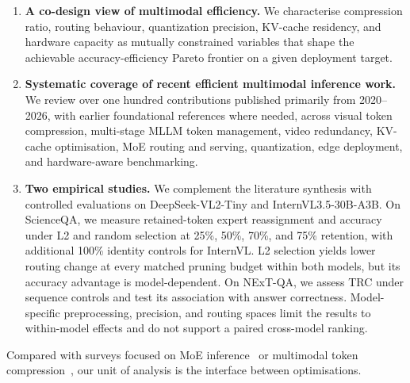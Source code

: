 \documentclass[10pt]{article}
\newenvironment{reviewchange}{\begingroup\color{red}}{\endgroup}
\begin{document}
\begin{reviewchange}
\begin{enumerate}[leftmargin=2em, itemsep=4pt]
  \item \textbf{A co-design view of multimodal efficiency.}  We characterise
  compression ratio, routing behaviour, quantization precision, KV-cache residency, and
  hardware capacity as mutually constrained variables that shape the achievable
  accuracy-efficiency Pareto frontier on a given deployment target.

  \item \textbf{Systematic coverage of recent efficient multimodal inference work.}
  We review over one hundred contributions published primarily from 2020--2026, with
  earlier foundational references where needed, across visual token compression,
  multi-stage MLLM token management, video redundancy, KV-cache optimisation, MoE
  routing and serving, quantization, edge deployment, and hardware-aware benchmarking.

  \item \textbf{Two empirical studies.} We complement the literature synthesis with
controlled evaluations on DeepSeek-VL2-Tiny and InternVL3.5-30B-A3B.
On ScienceQA, we measure retained-token expert reassignment and accuracy under L2
and random selection at 25\%, 50\%, 70\%, and 75\% retention, with additional
100\% identity controls for InternVL. L2 selection yields lower routing change at
every matched pruning budget within both models, but its accuracy advantage is
model-dependent. On NExT-QA, we assess TRC under sequence controls and test its
association with answer correctness. Model-specific preprocessing, precision, and
routing spaces limit the results to within-model effects and do not support a
paired cross-model ranking.
\end{enumerate}
\end{reviewchange}

Compared with surveys focused on MoE inference~\citep{liu2025surveyinferenceoptimizationtechniques}
or multimodal token compression~\citep{shao2026surveytokencompressionefficient}, our
unit of analysis is the interface between optimisations.
\end{document}

